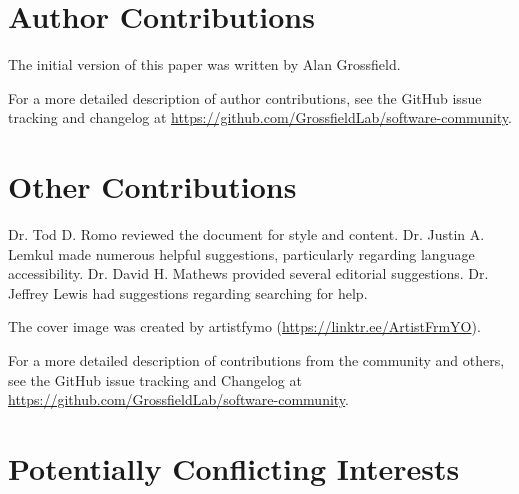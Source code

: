 \documentclass[9pt,training,pubversion]{livecoms}
\newcommand{\githubrepository}{\url{https://github.com/GrossfieldLab/software-community}}
\begin{document}
\section{Author Contributions}
%
The initial version of this paper was written by Alan Grossfield.


For a more detailed description of author contributions,
see the GitHub issue tracking and changelog at \githubrepository.

\section{Other Contributions}
%
Dr. Tod D. Romo reviewed the document for style and content. Dr. Justin A.
Lemkul made numerous helpful suggestions, particularly regarding language
accessibility. Dr. David H. Mathews provided several editorial suggestions. Dr.
Jeffrey Lewis had suggestions regarding searching for help.

The cover image was created by artistfymo (\url{https://linktr.ee/ArtistFrmYO}).

For a more detailed description of contributions from the community and others, see the GitHub issue tracking and Changelog at \githubrepository.

\section{Potentially Conflicting Interests}
\end{document}
